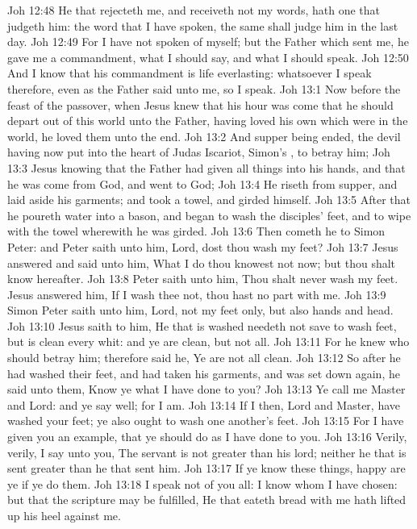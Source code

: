 \vs Joh 12:48 He that rejecteth me, and receiveth not my words, hath one that judgeth him: the word that I have spoken, the same shall judge him in the last day.
\vs Joh 12:49 For I have not spoken of myself; but the Father which sent me, he gave me a commandment, what I should say, and what I should speak.
\vs Joh 12:50 And I know that his commandment is life everlasting: whatsoever I speak therefore, even as the Father said unto me, so I speak.
\vs Joh 13:1 Now before the feast of the passover, when Jesus knew that his hour was come that he should depart out of this world unto the Father, having loved his own which were in the world, he loved them unto the end.
\vs Joh 13:2 And supper being ended, the devil having now put into the heart of Judas Iscariot, Simon's , to betray him;
\vs Joh 13:3 Jesus knowing that the Father had given all things into his hands, and that he was come from God, and went to God;
\vs Joh 13:4 He riseth from supper, and laid aside his garments; and took a towel, and girded himself.
\vs Joh 13:5 After that he poureth water into a bason, and began to wash the disciples' feet, and to wipe  with the towel wherewith he was girded.
\vs Joh 13:6 Then cometh he to Simon Peter: and Peter saith unto him, Lord, dost thou wash my feet?
\vs Joh 13:7 Jesus answered and said unto him, What I do thou knowest not now; but thou shalt know hereafter.
\vs Joh 13:8 Peter saith unto him, Thou shalt never wash my feet. Jesus answered him, If I wash thee not, thou hast no part with me.
\vs Joh 13:9 Simon Peter saith unto him, Lord, not my feet only, but also  hands and  head.
\vs Joh 13:10 Jesus saith to him, He that is washed needeth not save to wash  feet, but is clean every whit: and ye are clean, but not all.
\vs Joh 13:11 For he knew who should betray him; therefore said he, Ye are not all clean.
\vs Joh 13:12 So after he had washed their feet, and had taken his garments, and was set down again, he said unto them, Know ye what I have done to you?
\vs Joh 13:13 Ye call me Master and Lord: and ye say well; for  I am.
\vs Joh 13:14 If I then,  Lord and Master, have washed your feet; ye also ought to wash one another's feet.
\vs Joh 13:15 For I have given you an example, that ye should do as I have done to you.
\vs Joh 13:16 Verily, verily, I say unto you, The servant is not greater than his lord; neither he that is sent greater than he that sent him.
\vs Joh 13:17 If ye know these things, happy are ye if ye do them.
\vs Joh 13:18 I speak not of you all: I know whom I have chosen: but that the scripture may be fulfilled, He that eateth bread with me hath lifted up his heel against me.
